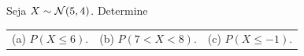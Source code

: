 %
%


\begin{exercicioBanco}[\valorquestao]
Seja \(X \sim \mathcal{N}(5,4)\). Determine
%
\begin{center}
    \begin{tabularx}{\textwidth}{XXX}
        (a) \(P(X \le 6)\). &
        (b) \(P(7 < X < 8)\). &
        (c) \(P(X \le -1)\).
    \end{tabularx}
\end{center}
%

\end{exercicioBanco}

